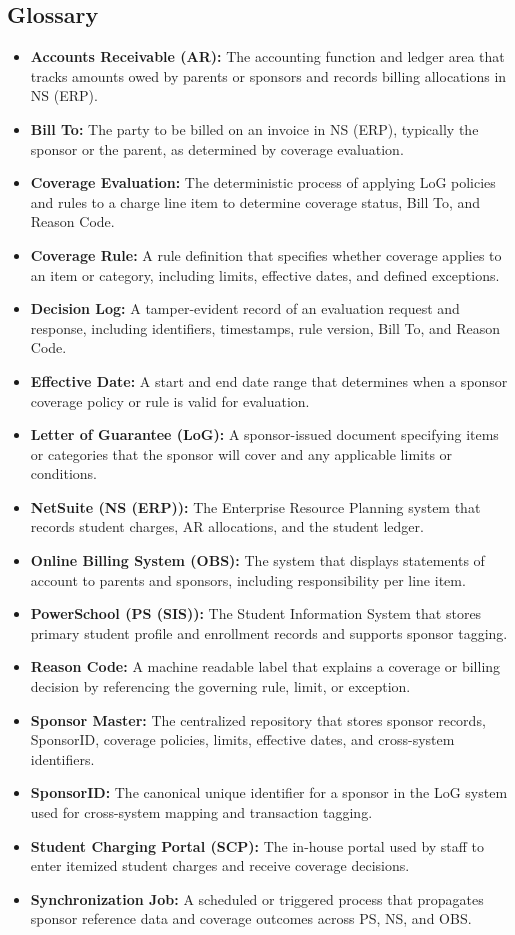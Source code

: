 \documentclass[12pt,a4paper]{article}
\begin{document}
\subsection{Glossary}
\begin{itemize}
  \item \textbf{Accounts Receivable (AR):} The accounting function and ledger area that tracks amounts owed by parents or sponsors and records billing allocations in NS (ERP).
  \item \textbf{Bill To:} The party to be billed on an invoice in NS (ERP), typically the sponsor or the parent, as determined by coverage evaluation.
  \item \textbf{Coverage Evaluation:} The deterministic process of applying LoG policies and rules to a charge line item to determine coverage status, Bill To, and Reason Code.
  \item \textbf{Coverage Rule:} A rule definition that specifies whether coverage applies to an item or category, including limits, effective dates, and defined exceptions.
  \item \textbf{Decision Log:} A tamper-evident record of an evaluation request and response, including identifiers, timestamps, rule version, Bill To, and Reason Code.
  \item \textbf{Effective Date:} A start and end date range that determines when a sponsor coverage policy or rule is valid for evaluation.
  \item \textbf{Letter of Guarantee (LoG):} A sponsor-issued document specifying items or categories that the sponsor will cover and any applicable limits or conditions.
  \item \textbf{NetSuite (NS (ERP)):} The Enterprise Resource Planning system that records student charges, AR allocations, and the student ledger.
  \item \textbf{Online Billing System (OBS):} The system that displays statements of account to parents and sponsors, including responsibility per line item.
  \item \textbf{PowerSchool (PS (SIS)):} The Student Information System that stores primary student profile and enrollment records and supports sponsor tagging.
  \item \textbf{Reason Code:} A machine readable label that explains a coverage or billing decision by referencing the governing rule, limit, or exception.
  \item \textbf{Sponsor Master:} The centralized repository that stores sponsor records, SponsorID, coverage policies, limits, effective dates, and cross-system identifiers.
  \item \textbf{SponsorID:} The canonical unique identifier for a sponsor in the LoG system used for cross-system mapping and transaction tagging.
  \item \textbf{Student Charging Portal (SCP):} The in-house portal used by staff to enter itemized student charges and receive coverage decisions.
  \item \textbf{Synchronization Job:} A scheduled or triggered process that propagates sponsor reference data and coverage outcomes across PS, NS, and OBS.
\end{itemize}
\end{document}
